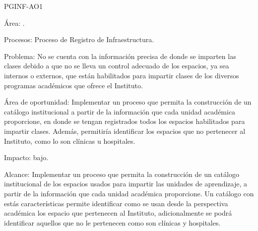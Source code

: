 \begin{AreaOportunidad}{PGINF-AO1}
	\item[Área:] .
	\item[Procesos:] Proceso de Registro de Infraestructura.
	\item[Problema:] 	No se cuenta con la información precisa de donde se imparten las clases debido a que  no se lleva un control adecuado de los espacios, ya sea internos o externos, que están habilitados para impartir clases de los diversos programas académicos que ofrece el Instituto.
	\item[Área de oportunidad:] Implementar un proceso que permita la construcción de un catálogo institucional a partir de la información que cada unidad académica proporcione, en donde se tengan registrados todos los espacios habilitados para impartir clases.  Además, permitiría identificar los espacios que no pertenecer al Instituto, como lo son clínicas u hospitales.  
	
	\item[Impacto:] bajo.
	\item[Alcance:] Implementar un proceso que permita la construcción de un catálogo institucional de los espacios usados para impartir las unidades de aprendizaje, a partir de la información que cada unidad académica proporcione. Un catálogo con estás características permite identificar como se usan desde la perspectiva académica los espacio que pertenecen al Instituto, adicionalmente se podrá identificar aquellos que no le pertenecen  como son clínicas y hospitales.

\end{AreaOportunidad}








